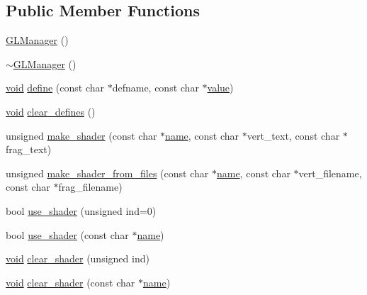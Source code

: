 \subsection*{Public Member Functions}
\begin{DoxyCompactItemize}
\item 
\hyperlink{classtrimesh_1_1GLManager_a112a5f5b48ffba4ffcd5605bb4c6d6ef}{G\+L\+Manager} ()
\item 
\hyperlink{classtrimesh_1_1GLManager_a2ceae5402999a9932058ed0f5a6595bf}{$\sim$\+G\+L\+Manager} ()
\item 
\hyperlink{namespacetrimesh_a784ddfd979e1c579bda795a8edfc3f43}{void} \hyperlink{classtrimesh_1_1GLManager_aadb5cf05653eb16a06f662265ee86ad3}{define} (const char $\ast$defname, const char $\ast$\hyperlink{namespacetrimesh_ab10cc1052c9d1d1376d92211b6ca27dd}{value})
\item 
\hyperlink{namespacetrimesh_a784ddfd979e1c579bda795a8edfc3f43}{void} \hyperlink{classtrimesh_1_1GLManager_a41184a813233411724ba864c93cb1adc}{clear\+\_\+defines} ()
\item 
unsigned \hyperlink{classtrimesh_1_1GLManager_a94896722a1121f1e919acd6a7fb7131c}{make\+\_\+shader} (const char $\ast$\hyperlink{namespacetrimesh_a7f24cdcfa73387d7fa6aa44676238a79}{name}, const char $\ast$vert\+\_\+text, const char $\ast$frag\+\_\+text)
\item 
unsigned \hyperlink{classtrimesh_1_1GLManager_ad1a456cf2a2438927a1b02d8a861e4ab}{make\+\_\+shader\+\_\+from\+\_\+files} (const char $\ast$\hyperlink{namespacetrimesh_a7f24cdcfa73387d7fa6aa44676238a79}{name}, const char $\ast$vert\+\_\+filename, const char $\ast$frag\+\_\+filename)
\item 
bool \hyperlink{classtrimesh_1_1GLManager_a8e0f44ceb57dc8bd4c4b75840e1b33cb}{use\+\_\+shader} (unsigned ind=0)
\item 
bool \hyperlink{classtrimesh_1_1GLManager_a9395996246b3a1219f5fda74abe39ee7}{use\+\_\+shader} (const char $\ast$\hyperlink{namespacetrimesh_a7f24cdcfa73387d7fa6aa44676238a79}{name})
\item 
\hyperlink{namespacetrimesh_a784ddfd979e1c579bda795a8edfc3f43}{void} \hyperlink{classtrimesh_1_1GLManager_a399b260a08d77d96efef3ae3ada38bcb}{clear\+\_\+shader} (unsigned ind)
\item 
\hyperlink{namespacetrimesh_a784ddfd979e1c579bda795a8edfc3f43}{void} \hyperlink{classtrimesh_1_1GLManager_a12756e75857c3b79ad142b80aee701f9}{clear\+\_\+shader} (const char $\ast$\hyperlink{namespacetrimesh_a7f24cdcfa73387d7fa6aa44676238a79}{name})

\end{DoxyCompactItemize}
